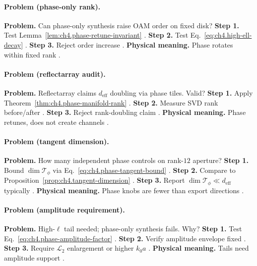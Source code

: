 \paragraph{Problem (phase-only rank).}
\textbf{Problem.} Can phase-only synthesis raise OAM order on fixed disk?
\textbf{Step 1.} Test Lemma~\ref{lem:ch4.phase-retune-invariant} \cite{hansen1988,harrington2001}.
\textbf{Step 2.} Test Eq.~\eqref{eq:ch4.high-ell-decay} \cite{jackson1999,devaney2004}.
\textbf{Step 3.} Reject order increase \cite{stratton1941}.
\textbf{Physical meaning.} Phase rotates within fixed rank \cite{harrington2001,collin2001}.

\paragraph{Problem (reflectarray audit).}
\textbf{Problem.} Reflectarray claims \(d_{\mathrm{eff}}\) doubling via phase tiles. Valid?
\textbf{Step 1.} Apply Theorem~\ref{thm:ch4.phase-manifold-rank} \cite{stratton1941,harrington2001}.
\textbf{Step 2.} Measure SVD rank before/after \cite{hansen1988,devaney2004}.
\textbf{Step 3.} Reject rank-doubling claim \cite{jackson1999}.
\textbf{Physical meaning.} Phase retunes, does not create channels \cite{collin2001}.

\paragraph{Problem (tangent dimension).}
\textbf{Problem.} How many independent phase controls on rank-\(12\) aperture?
\textbf{Step 1.} Bound \(\dim\mathcal{T}_{\phi}\) via Eq.~\eqref{eq:ch4.phase-tangent-bound} \cite{harrington2001,stratton1941}.
\textbf{Step 2.} Compare to Proposition~\ref{prop:ch4.tangent-dimension} \cite{devaney2004,hansen1988}.
\textbf{Step 3.} Report \(\dim\mathcal{T}_{\phi}\ll d_{\mathrm{eff}}\) typically \cite{jackson1999}.
\textbf{Physical meaning.} Phase knobs are fewer than export directions \cite{stratton1941}.

\paragraph{Problem (amplitude requirement).}
\textbf{Problem.} High-\(\ell\) tail needed; phase-only synthesis fails. Why?
\textbf{Step 1.} Test Eq.~\eqref{eq:ch4.phase-amplitude-factor} \cite{stratton1941,hansen1988}.
\textbf{Step 2.} Verify amplitude envelope fixed \cite{harrington2001,devaney2004}.
\textbf{Step 3.} Require \(\mathcal{L}_{2}\) enlargement or higher \(k_{0}a\) \cite{jackson1999,collin2001}.
\textbf{Physical meaning.} Tails need amplitude support \cite{hansen1988}.


